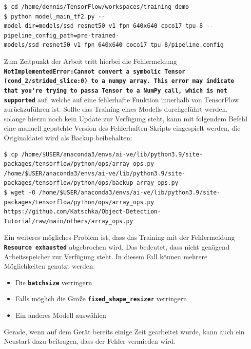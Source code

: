 \documentclass[12pt, oneside]{article}
\begin{document}
\begin{verbatim}
$ cd /home/dennis/TensorFlow/workspaces/training_demo
$ python model_main_tf2.py --model_dir=models/ssd_resnet50_v1_fpn_640x640_coco17_tpu-8 --pipeline_config_path=pre-trained-models/ssd_resnet50_v1_fpn_640x640_coco17_tpu-8/pipeline.config
\end{verbatim}
Zum Zeitpunkt der Arbeit tritt hierbei die Fehlermeldung \textbf{\texttt{NotImplementedError:\linebreak Cannot convert a symbolic Tensor (cond\_2/strided\_slice:0) to a \linebreak numpy array. This error may indicate that you're trying to pass\linebreak a Tensor to a NumPy call, which is not supported}} auf, welche auf eine \linebreak fehlerhafte Funktion innerhalb von TensorFlow zurückzuführen ist. Sollte das Training eines Modells durchgeführt werden, solange hierzu noch kein Update zur Verfügung steht, kann mit folgendem Befehl eine manuell gepatchte Version des Fehlerhaften Skripts eingespielt werden, die Originaldatei wird als Backup beibehalten:

\begin{verbatim}
$ cp /home/$USER/anaconda3/envs/ai-ve/lib/python3.9/site-packages/tensorflow/python/ops/array_ops.py /home/$USER/anaconda3/envs/ai-ve/lib/python3.9/site-packages/tensorflow/python/ops/backup_array_ops.py
$ wget -O /home/$USER/anaconda3/envs/ai-ve/lib/python3.9/site-packages/tensorflow/python/ops/array_ops.py https://github.com/Katschka/Object-Detection-Tutorial/raw/main/others/array_ops.py
\end{verbatim}
Ein weiteres mögliches Problem ist, dass das Training mit der Fehlermeldung \textbf{\texttt{Resource exhausted}} abgebrochen wird. Das bedeutet, dass nicht genügend Arbeitsspeicher zur Verfügung steht. In diesem Fall können mehrere Möglichkeiten genutzt werden:

\begin{itemize}
	\item Die \textbf{\texttt{batchsize}} verringern
	\item Falls möglich die Größe \textbf{\texttt{fixed\_shape\_resizer}} verringern
	\item Ein anderes Modell auswählen
\end{itemize}
Gerade, wenn auf dem Gerät bereits einige Zeit gearbeitet wurde, kann auch ein Neustart dazu beitragen, dass der Fehler vermieden wird.\\
\end{document}
